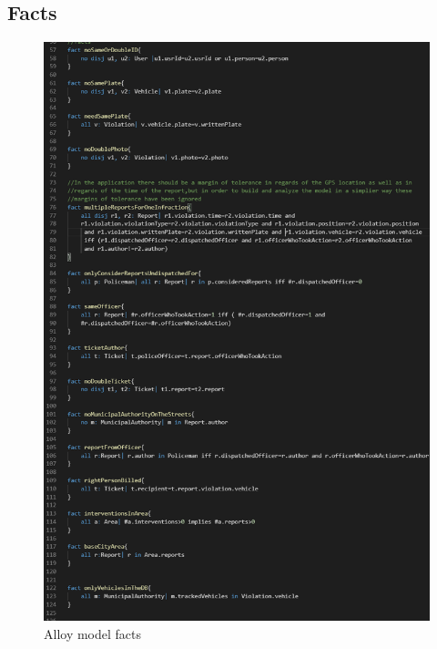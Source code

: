 \subsection{Facts}
\begin{figure}[h!]
	\includegraphics[scale=0.60]{Images/Facts_1-0}
	\caption{Alloy model facts}
\end{figure}
\newpage
